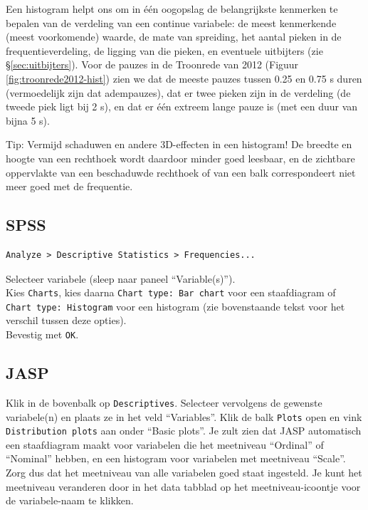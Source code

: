 \documentclass[
]{book}
\begin{document}
Een histogram helpt ons om in één oogopslag de belangrijkste kenmerken
te bepalen van de verdeling van een continue variabele: de meest
kenmerkende (meest voorkomende) waarde, de mate van spreiding, het
aantal pieken in de frequentieverdeling, de ligging van die pieken, en
eventuele uitbijters
(zie §\ref{sec:uitbijters}).
Voor de pauzes in de Troonrede van 2012
(Figuur \ref{fig:troonrede2012-hist}) zien we dat de meeste pauzes
tussen 0.25 en 0.75 s duren (vermoedelijk zijn dat adempauzes), dat er
twee pieken zijn in de verdeling (de tweede piek ligt bij 2 s),
en dat er één extreem lange pauze is (met een duur van bijna 5 s).

Tip: Vermijd schaduwen en andere 3D-effecten in een histogram! De
breedte en hoogte van een rechthoek wordt daardoor minder goed leesbaar,
en de zichtbare oppervlakte van een beschaduwde rechthoek of van een
balk correspondeert niet meer goed met de frequentie.

\hypertarget{spss-2}{%
\subsection{SPSS}\label{spss-2}}

\begin{verbatim}
Analyze > Descriptive Statistics > Frequencies...
\end{verbatim}

Selecteer variabele (sleep naar paneel ``Variable(s)'').\\
Kies \texttt{Charts}, kies daarna \texttt{Chart\ type:\ Bar\ chart} voor een
staafdiagram of \texttt{Chart\ type:\ Histogram} voor een histogram (zie
bovenstaande tekst voor het verschil tussen deze opties).\\
Bevestig met \texttt{OK}.\\

\hypertarget{jasp-2}{%
\subsection{JASP}\label{jasp-2}}

Klik in de bovenbalk op \texttt{Descriptives}. Selecteer vervolgens de gewenste variabele(n) en plaats ze in het veld ``Variables''. Klik de balk \texttt{Plots} open en vink \texttt{Distribution\ plots} aan onder ``Basic plots''. Je zult zien dat JASP automatisch een staafdiagram maakt voor variabelen die het meetniveau ``Ordinal'' of ``Nominal'' hebben, en een histogram voor variabelen met meetniveau ``Scale''. Zorg dus dat het meetniveau van alle variabelen goed staat ingesteld. Je kunt het meetniveau veranderen door in het data tabblad op het meetniveau-icoontje voor de variabele-naam te klikken.
\end{document}
